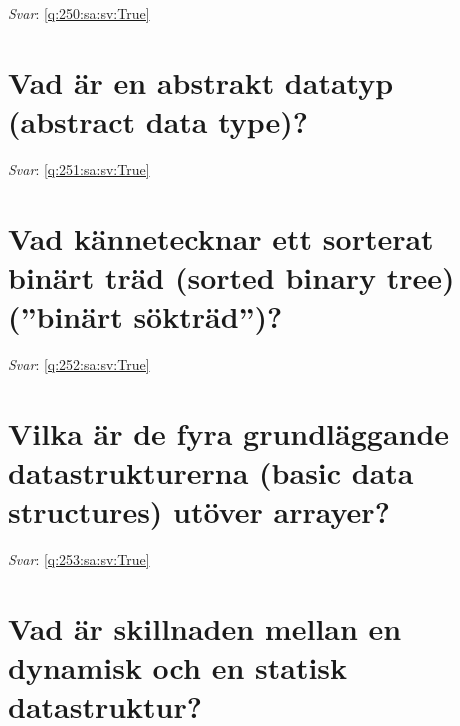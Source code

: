 \documentclass[a4paper,11pt,oneside]{book}
\begin{document}
\begin{sloppypar}
\textit{Svar}: \autoref{q:250:sa:sv:True}



\section{Vad \"ar en abstrakt datatyp (abstract data type)?}

\label{q:251:sa:sv:False}

\vspace{2cm}

\noindent\makebox[\textwidth]{\hrulefill}

\vspace{1cm}

\textit{Svar}: \autoref{q:251:sa:sv:True}



\section{Vad k\"annetecknar ett sorterat bin\"art tr\"ad (sorted binary tree) ({\textquotedblright}bin\"art s\"oktr\"ad{\textquotedblright})?}

\label{q:252:sa:sv:False}

\vspace{2cm}

\noindent\makebox[\textwidth]{\hrulefill}

\vspace{1cm}

\textit{Svar}: \autoref{q:252:sa:sv:True}



\section{Vilka \"ar de fyra grundl\"aggande datastrukturerna (basic data structures) ut\"over arrayer?}

\label{q:253:sa:sv:False}

\vspace{2cm}

\noindent\makebox[\textwidth]{\hrulefill}

\vspace{1cm}

\textit{Svar}: \autoref{q:253:sa:sv:True}



\section{Vad \"ar skillnaden mellan en dynamisk och en statisk datastruktur?}


\end{sloppypar}
\end{document}
